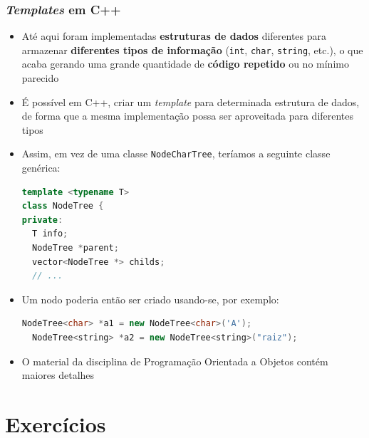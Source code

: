 \documentclass[aspectratio=169]{beamer}
\begin{document}
\begin{frame}[fragile]\frametitle{\emph{Templates} em C++}
\begin{itemize}
	\small
	\item Até aqui foram implementadas \textbf{estruturas de dados} diferentes para armazenar \textbf{diferentes tipos de informação} (\texttt{int}, \texttt{char}, \texttt{string}, etc.), o que acaba gerando uma grande quantidade de \textbf{código repetido} ou no mínimo parecido
	\item É possível em C++, criar um \emph{template} para determinada estrutura de dados, de forma que a mesma implementação possa ser aproveitada para diferentes tipos
	\item Assim, em vez de uma classe \texttt{NodeCharTree}, teríamos a seguinte classe genérica:
\begin{lstlisting}[language=C++,basicstyle=\ttfamily\tiny]
template <typename T>
class NodeTree {
private:
  T info;
  NodeTree *parent;
  vector<NodeTree *> childs;
  // ...
\end{lstlisting}
	\item Um nodo poderia então ser criado usando-se, por exemplo:
\begin{lstlisting}[language=C++,basicstyle=\ttfamily\tiny]
  NodeTree<char> *a1 = new NodeTree<char>('A');
  NodeTree<string> *a2 = new NodeTree<string>("raiz");
\end{lstlisting}
	\item O material da disciplina de Programação Orientada a Objetos contém maiores detalhes
\end{itemize}
\end{frame}
\section{Exercícios}
\end{document}
